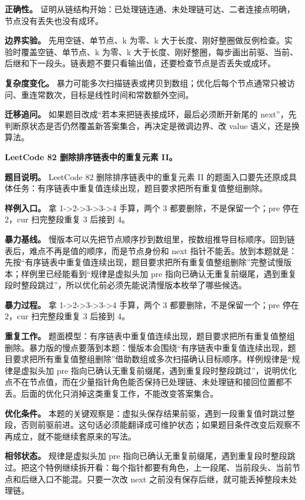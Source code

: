 \textbf{正确性。} 证明从链结构开始：已处理链连通、未处理链可达、二者连接点明确，节点没有丢失也没有成环。

\textbf{边界实验。} 先用空链、单节点、k 为零、k 大于长度、刚好整圈做反例检查。实验时覆盖空链、单节点、k 为零、k 大于长度、刚好整圈，每步画出前驱、当前、后继和下一段头。链表题不要只看输出值，还要检查节点是否丢失或成环。

\textbf{复杂度变化。} 暴力可能多次扫描链表或拷贝到数组；优化后每个节点通常只被访问、重连常数次，目标是线性时间和常数额外空间。

\textbf{迁移追问。} 如果题目改成“若本来把链表接成环，最后必须断开新尾的 next”，先判断原状态是否仍然覆盖新答案集合，再决定是微调边界、改 value 语义，还是换算法。

\noindent\textbf{LeetCode 82 删除排序链表中的重复元素 II。}

\textbf{题目说明。} LeetCode 82 删除排序链表中的重复元素 II 的题面入口要先还原成具体任务：有序链表中重复值连续出现，题目要求把所有重复值整组删除。

\textbf{样例入口。} 拿 1->2->3->3->4 手算，两个 3 都要删除，不是保留一个；pre 停在 2，cur 扫完整段重复 3 后接到 4。

\textbf{暴力基线。} 慢版本可以先把节点顺序抄到数组里，按数组推导目标顺序。回到链表后，难点不再是值的顺序，而是节点身份和 next 指针不能丢。放到本题就是：先按“有序链表中重复值连续出现，题目要求把所有重复值整组删除”完整试慢版本；样例里已经能看到“规律是虚拟头加 pre 指向已确认无重复前缀尾，遇到重复段时整段跳过”，所以优化前必须先能说清慢版本枚举了哪些候选。

\textbf{暴力过程。} 拿 1->2->3->3->4 手算，两个 3 都要删除，不是保留一个；pre 停在 2，cur 扫完整段重复 3 后接到 4。

\textbf{重复工作。} 题面模型：有序链表中重复值连续出现，题目要求把所有重复值整组删除。暴力版的慢点要落到本题：慢版本会围绕“有序链表中重复值连续出现，题目要求把所有重复值整组删除”借助数组或多次扫描确认目标顺序。样例规律是“规律是虚拟头加 pre 指向已确认无重复前缀尾，遇到重复段时整段跳过”，说明优化点不在节点值，而在少量指针角色能否保持已处理链、未处理链和接回位置都不丢。后面的优化只消掉这类重复工作，不能改变答案集合。

\textbf{优化条件。} 本题的关键观察是：虚拟头保存结果前驱，遇到一段重复值时跳过整段，否则前驱前进。这句话必须能翻译成可维护状态；如果题目条件改变后观察不再成立，就不能继续套原来的写法。

\textbf{相邻状态。} 规律是虚拟头加 pre 指向已确认无重复前缀尾，遇到重复段时整段跳过。把这个特例继续拆开看：每个指针都要有角色，上一段尾、当前段头、当前节点和后继入口不能混。只要一次改 next 之前没有保存后继，就可能丢掉整段未处理链。

